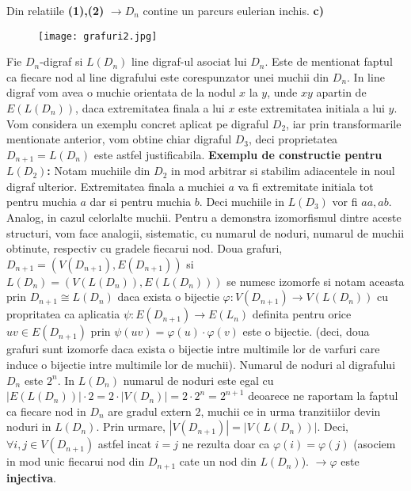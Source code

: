 \documentclass{article}
\begin{document}
\newline
\newline
Din relatiile \textbf{(1),(2)} $\rightarrow D_n$ contine un parcurs eulerian inchis.
\newline
\newline
\textbf{c)}
\begin{figure}[h]
\centering
\texttt{[image: grafuri2.jpg]}
\end{figure}
\newline
Fie $D_n$-digraf si $L(D_n)$ line digraf-ul asociat lui $D_n$. Este de mentionat faptul ca fiecare nod al line digrafului este corespunzator unei muchii din $D_n$. In line digraf vom avea o muchie orientata de la nodul $x$ la $y$, unde $xy$ apartin de $E(L(D_n))$, daca extremitatea finala a lui $x$ este extremitatea initiala a lui $y$. Vom considera un exemplu concret aplicat pe digraful $D_2$, iar prin transformarile mentionate anterior, vom obtine chiar digraful $D_3$, deci proprietatea $D_{n+1}=L(D_n)$ este  astfel justificabila.
\newline
\newline
\textbf{Exemplu de constructie pentru $L(D_2)$:} Notam muchiile din $D_2$ in mod arbitrar si stabilim adiacentele in noul digraf ulterior. Extremitatea finala a muchiei $a$ va fi extremitate initiala tot pentru muchia $a$ dar si pentru muchia $b$. Deci muchiile in $L(D_3)$ vor fi $aa, ab$. Analog, in cazul celorlalte muchii.
\newline
\newline
Pentru a demonstra izomorfismul dintre aceste structuri, vom face analogii, sistematic, cu numarul de noduri, numarul de muchii obtinute, respectiv cu gradele fiecarui nod.
\newline
\newline
Doua grafuri, $D_{n+1}=(V(D_{n+1}), E(D_{n+1}))$ si $L(D_n)=(V(L(D_n)), E(L(D_n)))$ se numesc izomorfe si notam aceasta prin $D_{n+1} \cong L(D_n)$ daca exista o bijectie $\varphi : V(D_{n+1}) \rightarrow V(L(D_n))$ cu propritatea ca aplicatia $\psi: E(D_{n+1}) \rightarrow E(L_n)$ definita pentru orice $uv \in E(D_{n+1})$ prin $\psi(uv)=\varphi(u) \cdot \varphi(v)$ este o bijectie. (deci, doua grafuri sunt izomorfe daca exista o bijectie intre multimile lor de varfuri care induce o bijectie intre multimile lor de muchii).
\newline
\newline
Numarul de noduri al digrafului $D_n$ este $2^n$. In $L(D_n)$ numarul de noduri este egal cu $|E(L(D_n))| \cdot 2=2 \cdot |V(D_n)|=2 \cdot 2^n= 2^{n+1}$ deoarece ne raportam la faptul ca fiecare nod in $D_n$ are gradul extern $2$, muchii ce in urma tranzitiilor devin noduri in $L(D_n)$. Prin urmare, $|V(D_{n+1})|=|V(L(D_n))|$. Deci, $\forall i,j \in V(D_{n+1})$ astfel incat $i=j$ ne rezulta doar ca $\varphi(i)=\varphi(j)$ (asociem in mod unic fiecarui nod din $D_{n+1}$ cate un nod din $L(D_n)$). $\rightarrow \varphi$ este \textbf{injectiva}.
\end{document}
